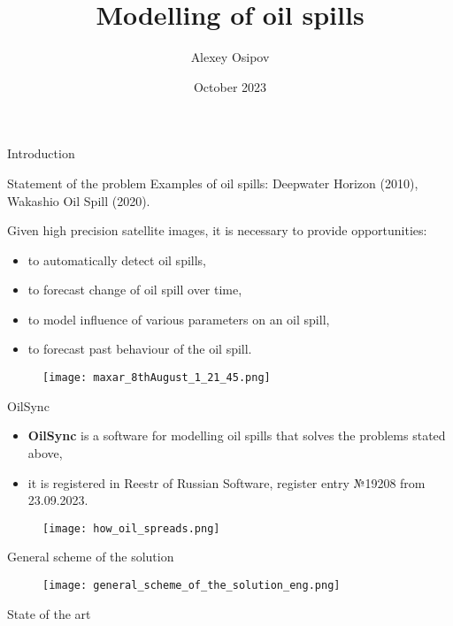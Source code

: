 \documentclass{beamer}
\title{Modelling of oil spills}
\author{
	Alexey Osipov\inst{1, 2}
}
\institute{
	\inst{1}
	Syncretis
	\inst{2}
	Tinkoff
}
\date{October 2023}
\begin{document}
\begin{frame}
\titlepage
\end{frame}	
\begin{section}{Introduction}
\begin{frame}{Statement of the problem}
Examples of oil spills: Deepwater Horizon (2010), Wakashio Oil Spill (2020).	
	
Given high precision satellite images, it is necessary to provide opportunities:
\begin{itemize}
	\item to automatically detect oil spills,
	\item to forecast change of oil spill over time,
	\item to model influence of various parameters on an oil spill,
	\item to forecast past behaviour of the oil spill.
\end{itemize}

\begin{figure}[H]
	\centering
	\texttt{[image: maxar\_8thAugust\_1\_21\_45.png]}
\end{figure}
\end{frame}
\begin{frame}{OilSync}
\begin{itemize}
	\item \textbf{OilSync} is a software for modelling oil spills that solves the problems stated above,
	\item it is registered in Reestr of Russian Software, register entry №19208 from 23.09.2023.
\end{itemize}

\begin{figure}[H]
	\centering
	\texttt{[image: how\_oil\_spreads.png]}
\end{figure}
\end{frame}

\begin{frame}{General scheme of the solution}

\begin{figure}[H]
	\centering
	\texttt{[image: general\_scheme\_of\_the\_solution\_eng.png]}
\end{figure}
	
\end{frame}

\begin{frame}{State of the art}
		

\end{frame}
\end{section}
\end{document}
